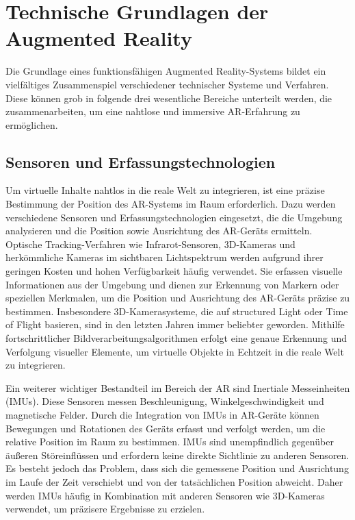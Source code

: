 \section{Technische Grundlagen der Augmented Reality}

Die Grundlage eines funktionsfähigen Augmented Reality-Systems bildet ein
vielfältiges Zusammenspiel verschiedener technischer Systeme und Verfahren.
Diese können grob in folgende drei wesentliche Bereiche unterteilt werden, die
zusammenarbeiten, um eine nahtlose und immersive AR-Erfahrung zu ermöglichen.

\subsection{Sensoren und Erfassungstechnologien}

Um virtuelle Inhalte nahtlos in die reale Welt zu integrieren, ist eine präzise
Bestimmung der Position des AR-Systems im Raum erforderlich. Dazu werden
verschiedene Sensoren und Erfassungstechnologien eingesetzt, die die Umgebung
analysieren und die Position sowie Ausrichtung des AR-Geräts ermitteln.
Optische Tracking-Verfahren wie Infrarot-Sensoren, 3D-Kameras und herkömmliche
Kameras im sichtbaren Lichtspektrum werden aufgrund ihrer geringen Kosten und
hohen Verfügbarkeit häufig verwendet. Sie erfassen visuelle Informationen aus
der Umgebung und dienen zur Erkennung von Markern oder speziellen Merkmalen, um
die Position und Ausrichtung des AR-Geräts präzise zu bestimmen. Insbesondere
3D-Kamerasysteme, die auf structured Light oder Time of Flight basieren, sind
in den letzten Jahren immer beliebter geworden. Mithilfe fortschrittlicher
Bildverarbeitungsalgorithmen erfolgt eine genaue Erkennung und Verfolgung
visueller Elemente, um virtuelle Objekte in Echtzeit in die reale Welt zu
integrieren.

Ein weiterer wichtiger Bestandteil im Bereich der AR sind Inertiale
Messeinheiten (IMUs). Diese Sensoren messen Beschleunigung,
Winkelgeschwindigkeit und magnetische Felder. Durch die Integration von IMUs in
AR-Geräte können Bewegungen und Rotationen des Geräts erfasst und verfolgt
werden, um die relative Position im Raum zu bestimmen. IMUs sind unempfindlich
gegenüber äußeren Störeinflüssen und erfordern keine direkte Sichtlinie zu
anderen Sensoren. Es besteht jedoch das Problem, dass sich die gemessene
Position und Ausrichtung im Laufe der Zeit verschiebt und von der tatsächlichen
Position abweicht. Daher werden IMUs häufig in Kombination mit anderen Sensoren
wie 3D-Kameras verwendet, um präzisere Ergebnisse zu erzielen.

